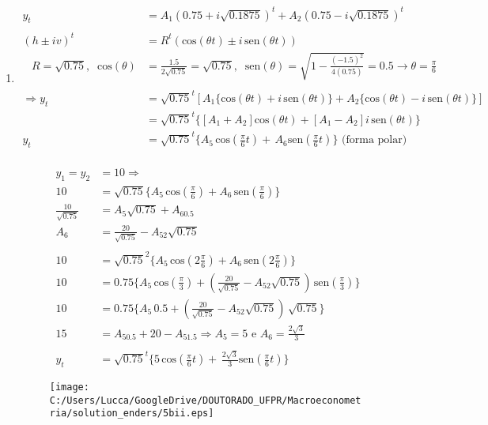\begin{enumerate}
\begin{enumerate}
\begin{enumerate}
	\item %
	
	\begin{align*}
		y_t&=A_1(0.75+i\sqrt{0.1875})^t+A_2(0.75-i\sqrt{0.1875})^t\\
		\\
		(h\pm iv)^t&=R^t(\text{cos}(\theta t)\pm i\,\text{sen}(\theta t))\\
		 \;\;\;R=\sqrt{0.75}, \;\; \text{cos}(\theta)&=\frac{1.5}{2\sqrt{0.75}}=\sqrt{0.75},\;\; \text{sen}(\theta)=\sqrt{1-\frac{(-1.5)^2}{4(0.75)}}=0.5\rightarrow \theta=\frac{\pi}{6}\\
		 \\
		\Rightarrow  y_t&=\sqrt{0.75}^t[A_1\{\text{cos}(\theta t)+ i\,\text{sen}(\theta t)\}+A_2\{\text{cos}(\theta t)- i\,\text{sen}(\theta t)\}]\\
		&=\sqrt{0.75}^t\{[A_1+A_2]\text{cos}(\theta t)+[A_1-A_2]i\,\text{sen}(\theta t)\}\\
		y_t&=\sqrt{0.75}^t\{A_5\,\text{cos}(\frac{\pi}{6} t)+\,A_6\text{sen}(\frac{\pi}{6} t)\}\text{ (forma polar) }\\
		\end{align*}
		
		\begin{align*}
		y_1=y_2&=10 \Rightarrow\\
		10&=\sqrt{0.75}\{A_5\,\text{cos}(\frac{\pi}{6} )+A_6\,\text{sen}(\frac{\pi}{6} )\}\\
			\frac{10}{\sqrt{0.75}}&=A_5\sqrt{0.75}+A_60.5\\
			A_6&=\frac{20}{\sqrt{0.75}}-A_52\sqrt{0.75}\\
			\\
			10&=\sqrt{0.75}^2\{A_5\,\text{cos}(2\frac{\pi}{6} )+A_6\,\text{sen}(2\frac{\pi}{6} )\}\\
			10&=0.75\{A_5\,\text{cos}(\frac{\pi}{3} )+(\frac{20}{\sqrt{0.75}}-A_52\sqrt{0.75})\,\text{sen}(\frac{\pi}{3} )\}\\
			10&=0.75\{A_5\,0.5+(\frac{20}{\sqrt{0.75}}-A_52\sqrt{0.75})\,\sqrt{0.75}\}\\
			15&=A_50.5+20-A_51.5\Rightarrow A_5=5 \text{ e } A_6=\frac{2\sqrt{3}}{3}\\
			\\
			y_t&=\sqrt{0.75}^t\{5\,\text{cos}(\frac{\pi}{6} t)+\,\frac{2\sqrt{3}}{3}\text{sen}(\frac{\pi}{6} t)\}
		\end{align*}
	
	\begin{figure}[h]
		\centering
		\texttt{[image: C:/Users/Lucca/GoogleDrive/DOUTORADO\_UFPR/Macroeconometria/solution\_enders/5bii.eps]}
	\end{figure}
	

\end{enumerate}
\end{enumerate}
\end{enumerate}
